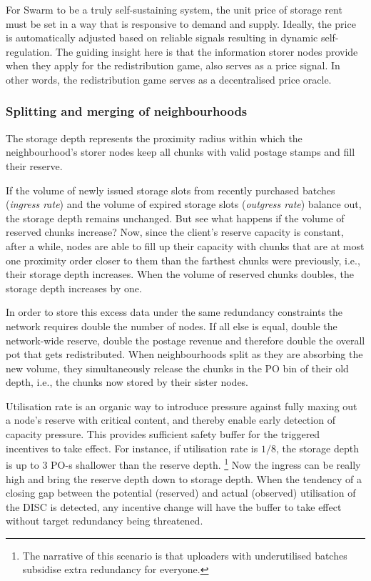 For Swarm to be a truly self-sustaining system, the unit price of storage rent must be set in a way that is responsive to demand and supply. Ideally, the price is automatically adjusted based on reliable signals resulting in dynamic self-regulation. The guiding insight here is that the information storer nodes provide when  they apply for the redistribution game, also serves as a price signal. In other words, the redistribution game serves as a decentralised price oracle.



\subsubsection{Splitting and merging of neighbourhoods}

The storage depth represents the proximity radius within which the neighbourhood's storer nodes keep all chunks with valid postage stamps and fill their reserve. 


If the volume of newly issued storage slots from recently purchased batches (\emph{ingress rate}\/) and the volume of expired storage slots (\emph{outgress rate}\/) balance out, the storage depth remains unchanged.
But see what happens  if the volume of  reserved chunks increase?
Now, since the client's reserve capacity is constant, after a while, nodes are able to fill up their capacity with chunks that are at most one proximity order closer to them than the farthest chunks were previously, i.e.,  their storage depth increases.
When the volume of reserved chunks doubles,  the storage depth increases by one.  

In order to store this excess data under the same redundancy constraints the network requires double the number of nodes. If all else is equal, double the network-wide reserve, double the postage revenue and therefore double the overall pot that gets redistributed. When neighbourhoods split as they are absorbing the new volume, they simultaneously release the chunks in the PO bin of their old depth, i.e., the chunks now stored by their sister nodes. 

Utilisation rate is an organic way to  introduce pressure against fully maxing out a node's reserve with critical content, and thereby enable early detection of capacity pressure. This provides  sufficient safety buffer for the triggered incentives to take effect. For instance,  if utilisation rate is $1/8$, the storage depth is up to 3 PO-s shallower than the reserve depth.%
%
\footnote{The narrative of this scenario is that uploaders with underutilised batches subsidise extra redundancy for everyone.}
%
Now the ingress can be really high and bring the reserve depth down to storage depth. When the tendency of a closing gap between the potential (reserved) and actual (observed) utilisation of the DISC is detected, any incentive change will have the buffer to take effect without target redundancy being threatened. 

